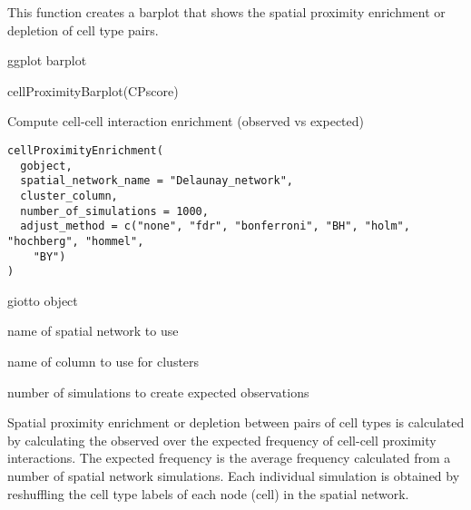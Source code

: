 \documentclass[a4paper]{book}
\begin{document}
%
\begin{Details}\relax
This function creates a barplot that shows the  spatial proximity
enrichment or depletion of cell type pairs.
\end{Details}
%
\begin{Value}
ggplot barplot
\end{Value}
%
\begin{Examples}
\begin{ExampleCode}
    cellProximityBarplot(CPscore)
\end{ExampleCode}
\end{Examples}
%
\begin{Description}\relax
Compute cell-cell interaction enrichment (observed vs expected)
\end{Description}
%
\begin{Usage}
\begin{verbatim}
cellProximityEnrichment(
  gobject,
  spatial_network_name = "Delaunay_network",
  cluster_column,
  number_of_simulations = 1000,
  adjust_method = c("none", "fdr", "bonferroni", "BH", "holm", "hochberg", "hommel",
    "BY")
)
\end{verbatim}
\end{Usage}
%
\begin{Arguments}
\begin{ldescription}
\item[\code{gobject}] giotto object

\item[\code{spatial\_network\_name}] name of spatial network to use

\item[\code{cluster\_column}] name of column to use for clusters

\item[\code{number\_of\_simulations}] number of simulations to create expected observations
\end{ldescription}
\end{Arguments}
%
\begin{Details}\relax
Spatial proximity enrichment or depletion between pairs of cell types
is calculated by calculating the observed over the expected frequency
of cell-cell proximity interactions. The expected frequency is the average frequency
calculated from a number of spatial network simulations. Each individual simulation is
obtained by reshuffling the cell type labels of each node (cell)
in the spatial network.
\end{Details}
\end{document}
